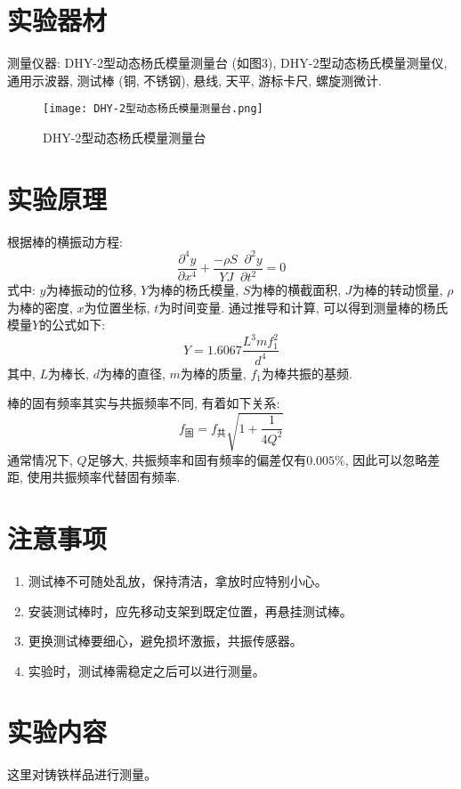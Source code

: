 \documentclass[11pt]{article}
\newcommand*{\pdif}{\mathop{}\!\partial}%
\newcommand*{\pderivh}[3]{\frac{\partial^{#1} #2}{\partial {#3^{#1}}}}
\begin{document}
\section{实验器材}

测量仪器: DHY-2型动态杨氏模量测量台 (如图3), DHY-2型动态杨氏模量测量仪, 通用示波器, 测试棒 (铜, 不锈钢), 悬线, 天平, 游标卡尺, 螺旋测微计.

\begin{figure}[H]
    \centering
    \texttt{[image: DHY-2型动态杨氏模量测量台.png]}
    \caption{DHY-2型动态杨氏模量测量台}
    \label{fig:动态杨氏模量测量台}
\end{figure}

\section{实验原理}

根据棒的横振动方程: 
\[
    \pderivh{4}{y}{x} + \frac{-\rho S\pdif^2y}{YJ\pdif t^2} = 0
\]
式中: $y$为棒振动的位移, $Y$为棒的杨氏模量, $S$为棒的横截面积, $J$为棒的转动惯量, $\rho$为棒的密度, $x$为位置坐标, $t$为时间变量. 通过推导和计算, 可以得到测量棒的杨氏模量$Y$的公式如下:
\[
    Y = 1.6067 \frac{L^3mf_1^2}{d^4}
\]
其中, $L$为棒长, $d$为棒的直径, $m$为棒的质量, $f_1$为棒共振的基频.

棒的固有频率其实与共振频率不同, 有着如下关系:
\[
    f_{\text{固}} = f_{\text{共}} \sqrt{1+\frac{1}{4Q^2}}
\]
通常情况下, $Q$足够大, 共振频率和固有频率的偏差仅有$0.005\%$, 因此可以忽略差距, 使用共振频率代替固有频率.

\section{注意事项}

\begin{enumerate}
    \item 测试棒不可随处乱放，保持清洁，拿放时应特别小心。
    \item 安装测试棒时，应先移动支架到既定位置，再悬挂测试棒。
    \item 更换测试棒要细心，避免损坏激振，共振传感器。
    \item 实验时，测试棒需稳定之后可以进行测量。
\end{enumerate}

\section{实验内容}

这里对铸铁样品进行测量。
\end{document}
